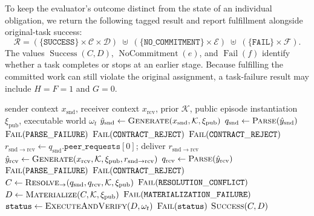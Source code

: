 \documentclass[sigconf,nonacm,balance=false]{aamas}
\begin{document}
To keep the evaluator's outcome distinct from the state of an individual obligation, we return the following tagged result and report fulfillment alongside original-task success:
\[
\mathcal R=
(\{\mathtt{SUCCESS}\}\times\mathcal C\times\mathcal D)
\;\uplus\;
(\{\mathtt{NO\_COMMITMENT}\}\times\mathcal E)
\;\uplus\;
(\{\mathtt{FAIL}\}\times\mathcal F).
\]
The values $\operatorname{Success}(C,D)$, $\operatorname{NoCommitment}(e)$, and $\operatorname{Fail}(f)$ identify whether a task completes or stops at an earlier stage. Because fulfilling the committed work can still violate the original assignment, a task-failure result may include $H=F=1$ and $G=0$.

\begin{algorithm}[!htbp]
  \caption{Learned Forward Resolution}
  \label{alg:forward}
  \footnotesize
  \begin{algorithmic}[1]
    \Require sender context $x_{\mathrm{snd}}$, receiver context $x_{\mathrm{rcv}}$, prior $\mathcal K$, public episode instantiation $\xi_{\mathrm{pub}}$, executable world $\omega_t$
    \State $\hat y_{\mathrm{snd}} \gets \textsc{Generate}(x_{\mathrm{snd}},\mathcal K,\xi_{\mathrm{pub}})$ 
    \State $q_{\mathrm{snd}} \gets \textsc{Parse}(\hat y_{\mathrm{snd}})$
     \State \Return $\textsc{Fail}(\mathtt{PARSE\_FAILURE})$ \EndIf
      \State \Return $\textsc{Fail}(\mathtt{CONTRACT\_REJECT})$
    \EndIf
      \State \Return $\textsc{Fail}(\mathtt{CONTRACT\_REJECT})$
    \EndIf
    \State $r_{\mathrm{snd}\rightarrow\mathrm{rcv}}\gets q_{\mathrm{snd}}.\mathtt{peer\_requests}[0]$; deliver $r_{\mathrm{snd}\rightarrow\mathrm{rcv}}$
    \State $\hat y_{\mathrm{rcv}} \gets \textsc{Generate}(x_{\mathrm{rcv}},\mathcal K,\xi_{\mathrm{pub}},r_{\mathrm{snd}\rightarrow\mathrm{rcv}})$
    \State $q_{\mathrm{rcv}} \gets \textsc{Parse}(\hat y_{\mathrm{rcv}})$
     \State \Return $\textsc{Fail}(\mathtt{PARSE\_FAILURE})$ \EndIf
      \State \Return $\textsc{Fail}(\mathtt{CONTRACT\_REJECT})$
    \EndIf
    \State $C \gets \textsc{Resolve}_{\rightarrow}(q_{\mathrm{snd}},q_{\mathrm{rcv}},\mathcal K,\xi_{\mathrm{pub}})$
     \State \Return $\textsc{Fail}(\mathtt{RESOLUTION\_CONFLICT})$ \EndIf
    \State $D \gets \textsc{Materialize}(C,\mathcal K,\xi_{\mathrm{pub}})$
     \State \Return $\textsc{Fail}(\mathtt{MATERIALIZATION\_FAILURE})$ \EndIf
    \State $\mathtt{status}\gets\textsc{ExecuteAndVerify}(D,\omega_t)$
     \State \Return $\textsc{Fail}(\mathtt{status})$ \EndIf
    \State \Return $\textsc{Success}(C,D)$
  \end{algorithmic}
\end{algorithm}
\end{document}
